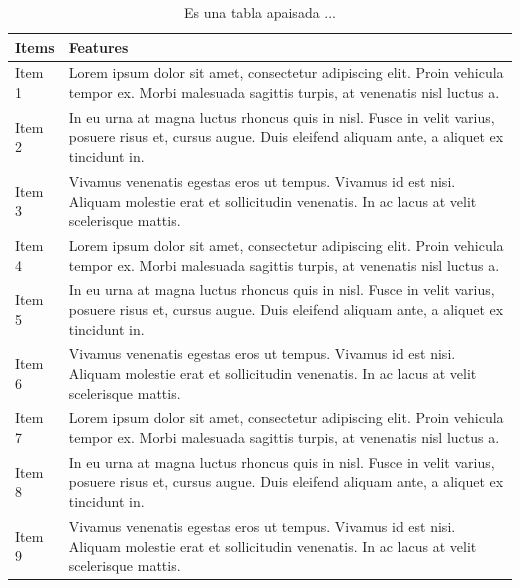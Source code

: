 \documentclass[12pt,a4paper,oneside,]{article}
\numberwithin{dummy}{section}
\theoremstyle{ocrenumbox}
\theoremstyle{blacknumex}
\theoremstyle{blacknumbox}
\theoremstyle{ocrenum}
\theoremstyle{ocrenum}
\begin{document}
\begingroup
\begin{table}
\centering
\caption{Es una tabla apaisada ...} \label{tab:sidewaystable}

\begin{tabular}{>{\raggedright\arraybackslash}p{2cm}>{\raggedright\arraybackslash}p{14cm}}
\toprule
Items & Features\\
\midrule
Item 1 & Lorem ipsum dolor sit amet, consectetur adipiscing elit.
    Proin vehicula tempor ex. Morbi malesuada sagittis turpis,
    at venenatis nisl luctus \vphantom{2} a.\\
Item 2 & In eu urna at magna luctus rhoncus quis in nisl. Fusce in velit
    varius, posuere risus et, cursus augue. Duis eleifend aliquam ante,
    a aliquet ex tincidunt \vphantom{2} in.\\
Item 3 & Vivamus venenatis egestas eros ut tempus. Vivamus id est nisi.
    Aliquam molestie erat et sollicitudin venenatis. In ac lacus at
    velit scelerisque \vphantom{2} mattis.\\
Item 4 & Lorem ipsum dolor sit amet, consectetur adipiscing elit.
    Proin vehicula tempor ex. Morbi malesuada sagittis turpis,
    at venenatis nisl luctus \vphantom{1} a.\\
Item 5 & In eu urna at magna luctus rhoncus quis in nisl. Fusce in velit
    varius, posuere risus et, cursus augue. Duis eleifend aliquam ante,
    a aliquet ex tincidunt \vphantom{1} in.\\
\addlinespace
Item 6 & Vivamus venenatis egestas eros ut tempus. Vivamus id est nisi.
    Aliquam molestie erat et sollicitudin venenatis. In ac lacus at
    velit scelerisque \vphantom{1} mattis.\\
Item 7 & Lorem ipsum dolor sit amet, consectetur adipiscing elit.
    Proin vehicula tempor ex. Morbi malesuada sagittis turpis,
    at venenatis nisl luctus a.\\
Item 8 & In eu urna at magna luctus rhoncus quis in nisl. Fusce in velit
    varius, posuere risus et, cursus augue. Duis eleifend aliquam ante,
    a aliquet ex tincidunt in.\\
Item 9 & Vivamus venenatis egestas eros ut tempus. Vivamus id est nisi.
    Aliquam molestie erat et sollicitudin venenatis. In ac lacus at
    velit scelerisque mattis.\\
\bottomrule
\end{tabular}
\end{table}
\endgroup

\clearpage
\end{document}
